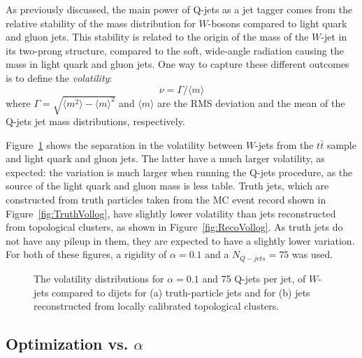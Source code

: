 As previously discussed, the main power of Q-jets as a jet tagger comes from the relative stability of the mass distribution for $W$-bosons compared to light quark and gluon jets. This stability is related to the origin of the mass of the $W$-jet in its two-prong structure, compared to the soft, wide-angle radiation causing the mass in light quark and gluon jets. One way to capture these different outcomes is to define the \textit{volatility}:
%
\begin{equation}
\nu=\Gamma/\langle m \rangle
\end{equation}
%
where $\Gamma=\sqrt{\langle m^2 \rangle-\langle m \rangle^2}$ and $\langle m \rangle$ are the RMS deviation and the mean of the Q-jets jet mass distributions, respectively.

Figure~\ref{fig:Vollog} shows the separation in the volatility between $W$-jets from the $t\bar{t}$ sample and light quark and gluon jets. The latter have a much larger volatility, as expected: the variation is much larger when running the Q-jets procedure, as the source of the light quark and gluon mass is less table. Truth jets, which are constructed from truth particles taken from the MC event record shown in Figure~\ref{fig:TruthVollog}, have slightly lower volatility than jets reconstructed from topological clusters, as shown in Figure~\ref{fig:RecoVollog}. As truth jets do not have any pileup in them, they are expected to have a slightly lower variation. For both of these figures, a rigidity of $\alpha = 0.1$ and a $N_{Q-jets} = 75$ was used.


\begin{figure}[htbp]
\centering
{}
\caption{The volatility distributions for $\alpha = 0.1$ and 75 Q-jets per jet, of $W$-jets compared to dijets for (a) truth-particle jets and for (b) jets reconstructed from locally calibrated topological clusters.} %
\label{fig:Vollog}
\end{figure}

\subsection{Optimization vs. $\alpha$}
\label{app:qjets:jetvol:alpha}

